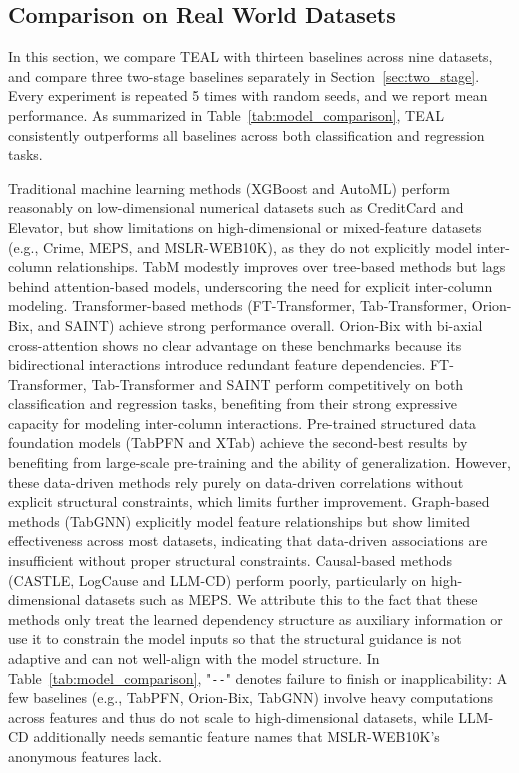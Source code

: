 \documentclass[conference]{IEEEtran}
\newcommand{\icde}[1]{{\color{black}#1}}
\newcommand{\rln}[1]{{\color{black}#1}}
\newcommand{\sydesi}[1]{{\color{black}#1}}
\newcommand{\sytwo}[1]{{\color{black}#1}}
\newcommand{\syfix}[1]{{\color{black}#1}}
\newcommand{\syne}[1]{{\color{black}#1}}
\newcommand{\zjic}[1]{{\color{black}#1}}
\newcommand{\syic}[1]{{\color{black}#1}}
\newcommand*{\ourmodel}{TEAL}
\begin{document}
\subsection{Comparison on Real World Datasets}

\rln{In this section, we compare \ourmodel{} with \syic{thirteen} baselines across \syic{nine} datasets, and \syic{compare three two-stage baselines separately in Section~\ref{sec:two_stage}}. }
\icde{Every experiment is repeated 5 times with random seeds, and we report mean performance.}
As summarized in Table~\ref{tab:model_comparison}, \ourmodel{} consistently outperforms all baselines across both classification and regression tasks.

\rln{
Traditional machine learning methods (XGBoost and AutoML) perform reasonably on low-dimensional numerical datasets such as CreditCard and Elevator, but show limitations on high-dimensional or mixed-feature datasets (e.g., Crime, MEPS, \syic{and MSLR-WEB10K}), as they do not explicitly model \sydesi{inter-column relationships}.
\syne{TabM modestly improves over tree-based methods but lags behind attention-based models, underscoring the need for explicit inter-column modeling.} 
\sytwo{Transformer-based methods (FT-Transformer, Tab-Transformer, \syfix{Orion-Bix,} and SAINT) achieve \syic{strong} performance overall. 
\syfix{
Orion-Bix with bi-axial cross-attention shows no clear advantage on these benchmarks because its bidirectional interactions introduce redundant feature dependencies.
} 
FT-Transformer, Tab-Transformer and SAINT perform competitively on both classification and regression tasks, benefiting from their strong expressive capacity for modeling inter-column interactions. 
\syic{Pre-trained structured data foundation models (TabPFN and XTab) achieve the second-best results by benefiting from large-scale pre-training and the ability of generalization.}
However, these \syic{data-driven} methods rely purely on data-driven correlations without explicit \syic{structural} constraints, which limits further improvement.
Graph-based methods (TabGNN) explicitly model feature relationships but show \sydesi{limited effectiveness} across most datasets, indicating that \sydesi{data-driven associations are} insufficient without proper structural constraints.}
\syic{
Causal-based methods (CASTLE, LogCause and LLM-CD) perform poorly, particularly on high-dimensional datasets such as MEPS. 
We attribute this to the fact that these methods only treat the learned dependency structure as auxiliary information or use it to constrain the model inputs 
\zjic{so that the structural guidance is not adaptive and can not well-align with the model structure.}
}
\zjic{In Table~\ref{tab:model_comparison}, "\texttt{-{}-}" denotes failure to finish or inapplicability: A few baselines (e.g., TabPFN, Orion-Bix, TabGNN) involve heavy computations across features and thus do not scale to high-dimensional datasets, while LLM-CD additionally needs semantic feature names that MSLR-WEB10K's anonymous features lack.}

}
\end{document}
